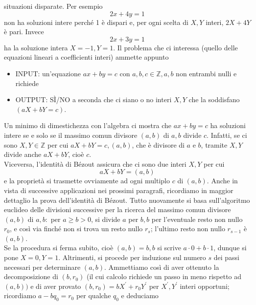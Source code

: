 \begin{enumerate}
          situazioni disparate. Per esempio
          $$
              2 x+4 y=1
          $$
          non ha soluzioni intere perché 1 è dispari e, per ogni scelta di $X,
              Y$ interi, $2 X+4 Y$ è pari. Invece
          $$
              2 x+3 y=1
          $$
          ha la soluzione intera $X=-1, Y=1$. Il problema che ci interessa
          (quello delle equazioni lineari a coefficienti interi) ammette appunto
          \begin{itemize}
              \item INPUT: un'equazione $a x+b y=c$ con $a, b, c \in \mathbb{Z},
                        a, b$ non entrambi nulli e richiede
              \item OUTPUT: SÌ/NO a seconda che ci siano o no interi $X, Y$ che
                    la soddisfano $(a X+b Y=c)$.
          \end{itemize}

          Un minimo di dimestichezza con l'algebra ci mostra che $a x+b y=c$ ha
          soluzioni intere se e solo se il massimo comun divisore $(a, b)$ di
          $a, b$ divide $c$. Infatti, se ci sono $X, Y \in \mathbb{Z}$ per cui
          $a X+b Y=c,(a, b)$, che è divisore di $a$ e $b$, tramite $X, Y$ divide
          anche $a X+b Y$, cioè $c$.\\
          Viceversa, l'identità di Bézout assicura
          che ci sono due interi $X, Y$ per cui
          $$
              a X+b Y=(a, b)
          $$
          e la proprietà si trasmette ovviamente ad ogni multiplo $c$ di $(a,
              b)$. Anche in vista di successive applicazioni nei prossimi paragrafi,
          ricordiamo in maggior dettaglio la prova dell'identità di Bézout.
          Tutto nuovamente si basa sull'algoritmo euclideo delle divisioni
          successive per la ricerca del massimo comun divisore $(a, b)$ di $a,
              b:$ per $a \geq b>0$, si divide $a$ per $b, b$ per l'eventuale resto
          non nullo $r_0$, e così via finché non si trova un resto nullo $r_s$;
          l'ultimo resto non nullo $r_{s-1}$ è $(a, b)$.\\
          Se la procedura si
          ferma subito, cioè $(a, b)=b, b$ si scrive $a \cdot 0+b \cdot 1$,
          dunque si pone $X=0, Y=1$. Altrimenti, si procede per induzione sul
          numero $s$ dei passi necessari per determinare $(a, b)$. Ammettiamo
          così di aver ottenuto la decomposizione di $\left(b, r_0\right)$ (il
          cui calcolo richiede un passo in meno rispetto ad $(a, b))$ e di aver
          provato $\left(b, r_0\right)=b X^{\prime}+r_0 Y^{\prime}$ per
          $X^{\prime}, Y^{\prime}$ interi opportuni; ricordiamo $a-b q_0=r_0$
          per qualche $q_0$ e deduciamo


\end{enumerate}

